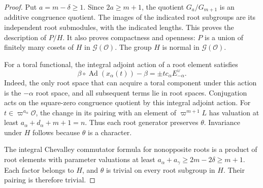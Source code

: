 \documentclass[10pt]{amsart}
\newcommand{\Ocal}{\mathcal O}
\newcommand{\Gcal}{\mathcal G}
\begin{document}
\begin{proof}
Put $a=m-\delta\geq1$. Since $2a\geq m+1$, the quotient
$G_a/G_{m+1}$ is an additive congruence quotient. The images of the indicated
root subgroups are its independent root submodules, with the indicated lengths.
This proves the description of $P/H$. It also proves compactness and openness:
$P$ is a union of finitely many cosets of $H$ in $\Gcal(\Ocal)$.
The group $H$ is normal in $\Gcal(\Ocal)$.

For a toral functional, the integral adjoint action of a root element satisfies
\[
 \beta\circ\operatorname{Ad}(x_\alpha(t))-\beta
       =\pm t c_\alpha E_{-\alpha}^\vee.
\]
Indeed, the only root space that can acquire a toral component under this
action is the $-\alpha$ root space, and all subsequent terms lie in root spaces.
Conjugation acts on the square-zero congruence quotient by this integral adjoint
action. For $t\in\varpi^{a_\alpha}\Ocal$, the change in its pairing with an
element of $\varpi^{m+1}L$ has valuation at least
$a_\alpha+d_\alpha+m+1=n$. Thus each root generator preserves $\theta$.
Invariance under $H$ follows because $\theta$ is a character.

The integral Chevalley commutator formula for nonopposite roots is a product
of root elements with parameter valuations at least
$a_\alpha+a_\gamma\geq2m-2\delta\geq m+1$. Each factor belongs to $H$, and
$\theta$ is trivial on every root subgroup in $H$. Their pairing is therefore
trivial.


\end{proof}
\end{document}
